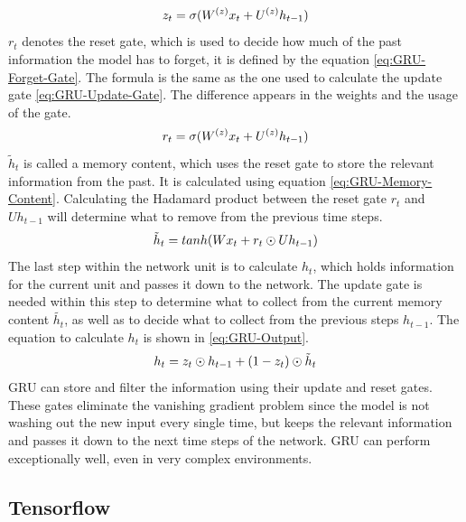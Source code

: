 \begin{equation}
    \centering
    z_t = \sigma(W^{(z)}x_t + U^{(z)}h_{t-1})
    \label{eq:GRU-Update-Gate}
\end{equation}
$r_t$ denotes the reset gate, which is used to decide how much of the past information the model has to forget, it is defined by the equation \ref{eq:GRU-Forget-Gate}. The formula is the same as the one used to calculate the update gate \ref{eq:GRU-Update-Gate}. The difference appears in the weights and the usage of the gate.
\begin{equation}
    \centering
    r_t = \sigma(W^{(z)}x_t + U^{(z)}h_{t-1})
    \label{eq:GRU-Forget-Gate}
\end{equation}
$\tilde{h}_t$ is called a memory content, which uses the reset gate to store the relevant information from the past. It is calculated using equation \ref{eq:GRU-Memory-Content}. Calculating the Hadamard product between the reset gate $r_t$ and $Uh_{t-1}$ will determine what to remove from the previous time steps.
\begin{equation}
    \centering
    \tilde{h}_t = tanh(Wx_t + r_t \odot Uh_{t-1})
    \label{eq:GRU-Memory-Content}
\end{equation}
The last step within the network unit is to calculate $h_t$, which holds information for the current unit and passes it down to the network. The update gate is needed within this step to determine what to collect from the current memory content $\tilde{h_t}$, as well as to decide what to collect from the previous steps $h_{t-1}$. The equation to calculate $h_t$ is shown in \ref{eq:GRU-Output}.
\begin{equation}
    \centering
    h_t = z_t \odot h_{t-1} + (1-z_t) \odot \tilde{h}_t
    \label{eq:GRU-Output}
\end{equation}
\gls{GRU} can store and filter the information using their update and reset gates. These gates eliminate the vanishing gradient problem since the model is not washing out the new input every single time, but keeps the relevant information and passes it down to the next time steps of the network. \gls{GRU} can perform exceptionally well, even in very complex environments.

\subsection{Tensorflow}
\label{sub:Tensorflow}


